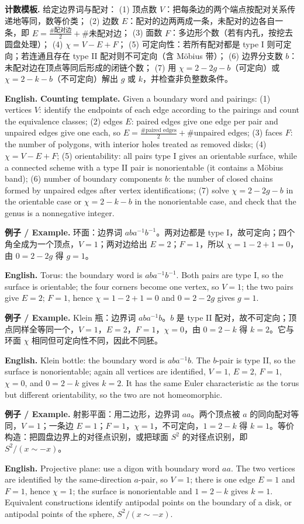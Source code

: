 \documentclass[UTF8,11pt,a4paper]{ctexart}
\newcommand{\EN}[1]{\par\noindent\textbf{English.} #1\par}
\newcommand{\EX}[2]{\par\noindent\textbf{例子 / Example.} #1\par\EN{#2}}
\begin{document}
\noindent\textbf{计数模板.} 给定边界词与配对：
(1) 顶点数 $V$：把每条边的两个端点按配对关系传递地等同，数等价类；
(2) 边数 $E$：配对的边两两成一条，未配对的边各自一条，即 $E=\frac{\#\text{配对边}}2+\#\text{未配对边}$；
(3) 面数 $F$：多边形个数（若有内孔，按挖去圆盘处理）；
(4) $\chi=V-E+F$；
(5) 可定向性：若所有配对都是 type I 则可定向；若连通且存在 type II 配对则不可定向（含 M\"obius 带）；
(6) 边界分支数 $b$：未配对边在顶点等同后形成的闭链个数；
(7) 用 $\chi=2-2g-b$（可定向）或 $\chi=2-k-b$（不可定向）解出 $g$ 或 $k$，并检查非负整数条件。
\EN{\textbf{Counting template.} Given a boundary word and pairings: (1) vertices $V$: identify the endpoints of each edge according to the pairings and count the equivalence classes; (2) edges $E$: paired edges give one edge per pair and unpaired edges give one each, so $E=\frac{\#\text{paired edges}}2+\#\text{unpaired edges}$; (3) faces $F$: the number of polygons, with interior holes treated as removed disks; (4) $\chi=V-E+F$; (5) orientability: all pairs type I gives an orientable surface, while a connected scheme with a type II pair is nonorientable (it contains a M\"obius band); (6) number of boundary components $b$: the number of closed chains formed by unpaired edges after vertex identifications; (7) solve $\chi=2-2g-b$ in the orientable case or $\chi=2-k-b$ in the nonorientable case, and check that the genus is a nonnegative integer.}

\EX{环面：边界词 $aba^{-1}b^{-1}$。两对边都是 type I，故可定向；四个角全成为一个顶点，$V=1$；两对边给出 $E=2$；$F=1$，所以 $\chi=1-2+1=0$，由 $0=2-2g$ 得 $g=1$。}{Torus: the boundary word is $aba^{-1}b^{-1}$. Both pairs are type I, so the surface is orientable; the four corners become one vertex, so $V=1$; the two pairs give $E=2$; $F=1$, hence $\chi=1-2+1=0$ and $0=2-2g$ gives $g=1$.}

\EX{Klein 瓶：边界词 $aba^{-1}b$。$b$ 是 type II 配对，故不可定向；顶点同样全等同一个，$V=1$，$E=2$，$F=1$，$\chi=0$，由 $0=2-k$ 得 $k=2$。它与环面 $\chi$ 相同但可定向性不同，因此不同胚。}{Klein bottle: the boundary word is $aba^{-1}b$. The $b$-pair is type II, so the surface is nonorientable; again all vertices are identified, $V=1$, $E=2$, $F=1$, $\chi=0$, and $0=2-k$ gives $k=2$. It has the same Euler characteristic as the torus but different orientability, so the two are not homeomorphic.}

\EX{射影平面：用二边形，边界词 $aa$。两个顶点被 $a$ 的同向配对等同，$V=1$；一条边 $E=1$；$F=1$，$\chi=1$，不可定向，$1=2-k$ 得 $k=1$。等价构造：把圆盘边界上的对径点识别，或把球面 $S^2$ 的对径点识别，即 $S^2/(x\sim-x)$。}{Projective plane: use a digon with boundary word $aa$. The two vertices are identified by the same-direction $a$-pair, so $V=1$; there is one edge $E=1$ and $F=1$, hence $\chi=1$; the surface is nonorientable and $1=2-k$ gives $k=1$. Equivalent constructions identify antipodal points on the boundary of a disk, or antipodal points of the sphere, $S^2/(x\sim-x)$.}
\end{document}
